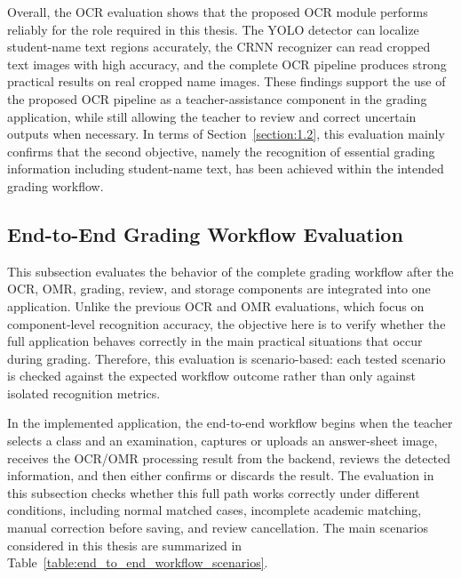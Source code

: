 \documentclass[../Main.tex]{subfiles}
\begin{document}
Overall, the OCR evaluation shows that the proposed OCR module performs reliably
for the role required in this thesis. The YOLO detector can localize student-name
text regions accurately, the CRNN recognizer can read cropped text images with
high accuracy, and the complete OCR pipeline produces strong practical results
on real cropped name images. These findings support the use of the proposed OCR
pipeline as a teacher-assistance component in the grading application, while
still allowing the teacher to review and correct uncertain outputs when
necessary. In terms of Section~\ref{section:1.2}, this evaluation mainly
confirms that the second objective, namely the recognition of essential
grading information including student-name text, has been achieved within the
intended grading workflow.

\subsection{End-to-End Grading Workflow Evaluation}
\label{subsection:4.3.3}

This subsection evaluates the behavior of the complete grading workflow after
the OCR, OMR, grading, review, and storage components are integrated into one
application. Unlike the previous OCR and OMR evaluations, which focus on
component-level recognition accuracy, the objective here is to verify whether
the full application behaves correctly in the main practical situations that
occur during grading. Therefore, this evaluation is scenario-based: each tested
scenario is checked against the expected workflow outcome rather than only
against isolated recognition metrics.

In the implemented application, the end-to-end workflow begins when the teacher
selects a class and an examination, captures or uploads an answer-sheet image,
receives the OCR/OMR processing result from the backend, reviews the detected
information, and then either confirms or discards the result. The evaluation in
this subsection checks whether this full path works correctly under different
conditions, including normal matched cases, incomplete academic matching,
manual correction before saving, and review cancellation. The main scenarios
considered in this thesis are summarized in
Table~\ref{table:end_to_end_workflow_scenarios}.
\end{document}
